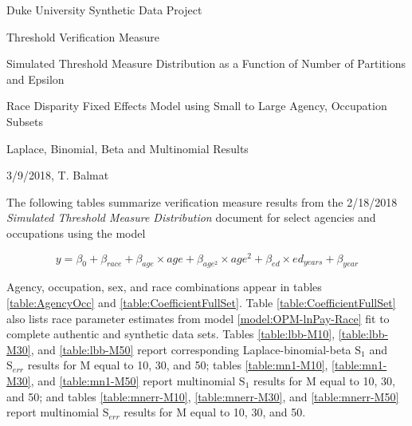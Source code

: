 \documentclass[10pt, letterpaper]{article}
\begin{document}
\begin{spacing}{1.0}

Duke University Synthetic Data Project
    
Threshold Verification Measure

Simulated Threshold Measure Distribution as a Function of Number of Partitions and Epsilon

Race Disparity Fixed Effects Model using Small to Large Agency, Occupation Subsets

Laplace, Binomial, Beta and Multinomial Results

3/9/2018, T. Balmat

\vspace{20pt}

The following tables summarize verification measure results from the 2/18/2018 \textit{Simulated Threshold Measure Distribution} document for select agencies and occupations using the model

\vspace{-24pt}
\begin{center}
    \begin{equation}
    y=\beta_0 + \beta_{race} + \beta_{age} \times age + \beta_{age^2} \times age^2 + \beta_{ed} \times ed_{years} + \beta_{year}
    \label{model:OPM-lnPay-Race}
    \end{equation}
\end{center}

Agency, occupation, sex, and race combinations appear in tables \ref{table:AgencyOcc} and \ref{table:CoefficientFullSet}.  Table \ref{table:CoefficientFullSet} also lists race parameter estimates from model \ref{model:OPM-lnPay-Race} fit to complete authentic and synthetic data sets.  Tables \ref{table:lbb-M10}, \ref{table:lbb-M30}, and \ref{table:lbb-M50} report corresponding Laplace-binomial-beta $\text{S}_1$ and $\text{S}_{err}$ results for M equal to 10, 30, and 50; tables \ref{table:mn1-M10}, \ref{table:mn1-M30}, and \ref{table:mn1-M50} report multinomial $\text{S}_1$ results for M equal to 10, 30, and 50; and tables \ref{table:mnerr-M10}, \ref{table:mnerr-M30}, and \ref{table:mnerr-M50} report multinomial $\text{S}_{err}$ results for M equal to 10, 30, and 50.

\vspace{20pt}


\end{spacing}
\end{document}
